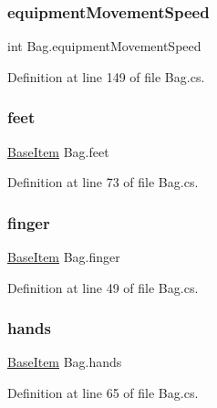 \subsubsection{\texorpdfstring{equipmentMovementSpeed}{equipmentMovementSpeed}}
{\footnotesize\ttfamily int Bag.\+equipment\+Movement\+Speed\hspace{0.3cm}{\ttfamily [get]}}



Definition at line 149 of file Bag.\+cs.

\mbox{\label{class_bag_a45172ef71e457ce9c818866fc0ffd5c2}} 
\subsubsection{\texorpdfstring{feet}{feet}}
{\footnotesize\ttfamily \mbox{\hyperlink{class_base_item}{Base\+Item}} Bag.\+feet\hspace{0.3cm}{\ttfamily [get]}}



Definition at line 73 of file Bag.\+cs.

\mbox{\label{class_bag_a0517877fdabd6917389995deecabe057}} 
\subsubsection{\texorpdfstring{finger}{finger}}
{\footnotesize\ttfamily \mbox{\hyperlink{class_base_item}{Base\+Item}} Bag.\+finger\hspace{0.3cm}{\ttfamily [get]}}



Definition at line 49 of file Bag.\+cs.

\mbox{\label{class_bag_a19700ba62882ea2e03f954a6b4f267fa}} 
\subsubsection{\texorpdfstring{hands}{hands}}
{\footnotesize\ttfamily \mbox{\hyperlink{class_base_item}{Base\+Item}} Bag.\+hands\hspace{0.3cm}{\ttfamily [get]}}



Definition at line 65 of file Bag.\+cs.

